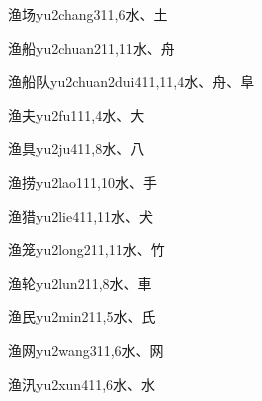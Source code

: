 \begin{entry}{渔场}{yu2chang3}{11,6}{⽔、⼟}
\end{entry}

\begin{entry}{渔船}{yu2chuan2}{11,11}{⽔、⾈}
\end{entry}

\begin{entry}{渔船队}{yu2chuan2dui4}{11,11,4}{⽔、⾈、⾩}
\end{entry}

\begin{entry}{渔夫}{yu2fu1}{11,4}{⽔、⼤}
\end{entry}

\begin{entry}{渔具}{yu2ju4}{11,8}{⽔、⼋}
\end{entry}

\begin{entry}{渔捞}{yu2lao1}{11,10}{⽔、⼿}
\end{entry}

\begin{entry}{渔猎}{yu2lie4}{11,11}{⽔、⽝}
\end{entry}

\begin{entry}{渔笼}{yu2long2}{11,11}{⽔、⽵}
\end{entry}

\begin{entry}{渔轮}{yu2lun2}{11,8}{⽔、⾞}
\end{entry}

\begin{entry}{渔民}{yu2min2}{11,5}{⽔、⽒}
\end{entry}

\begin{entry}{渔网}{yu2wang3}{11,6}{⽔、⽹}
\end{entry}

\begin{entry}{渔汛}{yu2xun4}{11,6}{⽔、⽔}
\end{entry}

